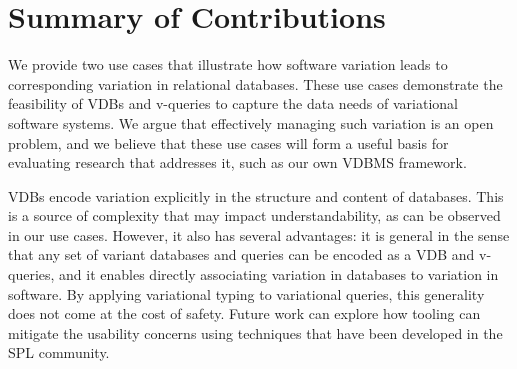 \section{Summary of Contributions}
\label{sec:sum-contr}

We provide two use cases that illustrate how software variation leads to
corresponding variation in relational databases. These use cases demonstrate
the feasibility of VDBs and v-queries to capture the data needs of variational
software systems.
%
We argue that effectively managing such variation is an open problem, and we
believe that these use cases will form a useful basis for evaluating
research that addresses it, such as our own VDBMS framework.
%
%


VDBs encode variation explicitly in the structure and content of databases.
%
This is a source of complexity that may impact understandability, as can be
observed in our use cases. However, it also has several advantages: it
is general in the sense that any set of variant databases and queries can be
encoded as a VDB and v-queries, and it enables directly associating variation
in databases to variation in software.
%
By applying variational typing to variational queries, this generality does not
come at the cost of safety. Future work can explore how tooling can mitigate
the usability concerns using techniques that have been developed in the SPL
community.



